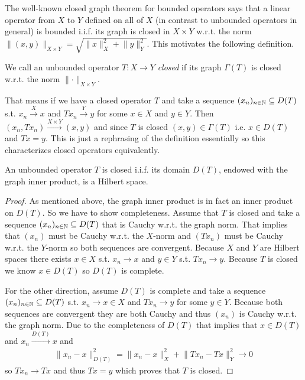 \documentclass[../master_thesis.tex]{subfiles}
\begin{document}
The well-known closed graph theorem for bounded operators says that 
a linear operator from $X$ to $Y$ defined on all of $X$ 
(in contrast to unbounded operators in general) is bounded i.i.f. 
its graph is closed in $X\times Y$ w.r.t. the norm 
$\lVert (x,y) \rVert _{X\times Y} 
= \sqrt{\lVert x \rVert^2 _{X} + \lVert y \rVert^2 _{Y}}$. 
This motivates the following definition.

\begin{definition}
    We call an unbounded operator $T:X \rightarrow Y$ \textit{closed} if 
    its graph $\Gamma(T)$ is closed w.r.t. the norm 
    $\lVert \cdot \rVert _{X\times Y}$.
\end{definition}
That means if we have a closed operator $T$ and
take a sequence $(x_n)_{n\in \mathbb{N}} \subseteq D(T)$
s.t. $x_n \xrightarrow{X} x$ and $Tx_n \xrightarrow{Y} y$ for some 
$x \in X$ and $y \in Y$. Then $(x_n,Tx_n) \xrightarrow{X\times Y} (x,y)$ and 
since $T$ is closed
$(x,y) \in \Gamma(T)$ i.e. $x \in D(T)$ and $Tx = y$. This is just 
a rephrasing of the definition essentially so this characterizes closed
operators equivalently.

\begin{proposition}\label{prop:closed_operator_graph_norm}
    An unbounded operator $T$ is closed i.i.f. its domain $D(T)$, endowed with the 
    graph inner product, is a Hilbert space.
\end{proposition}
\begin{proof}
    As mentioned above, the graph inner product is in fact an inner product 
    on $D(T)$. So we have to show completeness.
    Assume that $T$ is closed and take a sequence $(x_n)_{n \in \mathbb{N}} 
    \subseteq D(T)$ that is Cauchy w.r.t. the graph norm. That implies 
    that $(x_n)$ must be Cauchy w.r.t. the $X$-norm and $(Tx_n)$ must be 
    Cauchy w.r.t. the $Y$-norm so both sequences are convergent. Because $X$ and $Y$ are Hilbert spaces 
    there exists $x \in X$ s.t. $x_n \rightarrow x$ and $y \in Y$ s.t. 
    $Tx_n \rightarrow y$. Because $T$ is closed we know 
    $x \in D(T)$ so $D(T)$ is complete.

    For the other direction, assume $D(T)$ is complete and take a sequence 
    $(x_n)_{n \in \mathbb{N}} \subseteq D(T)$ s.t. $x_n \rightarrow x \in X$ 
    and $Tx_n \rightarrow y$ for some $y \in Y$. Because both sequences are 
    convergent they are both Cauchy and thus $(x_n)$ is Cauchy w.r.t. the
    graph norm. Due to the completeness of $D(T)$ that implies that $x \in D(T)$
    and $x_n \xrightarrow{D(T)} x$ and 
    \begin{align*}
        \lVert x_n - x \rVert^2 _{D(T)} 
        = \lVert x_n - x \rVert^2 _X + \lVert Tx_n - Tx \rVert^2 _Y 
        \rightarrow 0
    \end{align*}
    so $T x_n \rightarrow T x$ and thus $Tx = y$ which proves that 
    $T$ is closed.
\end{proof}
\end{document}
